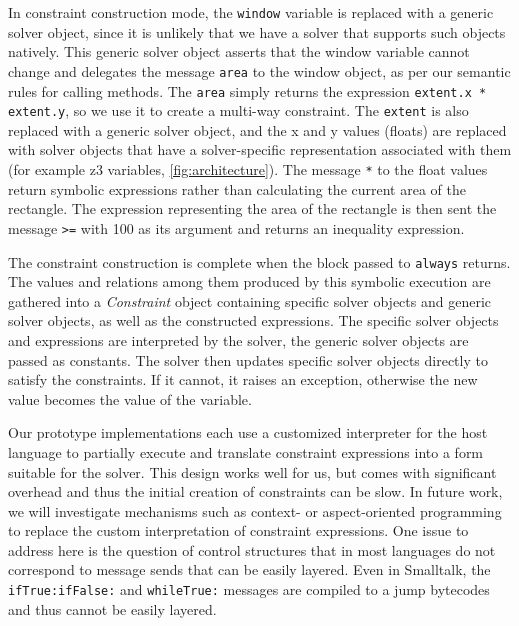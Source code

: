 In constraint construction mode, the \lstinline{window} variable is replaced
with a generic solver object, since it is unlikely that we have a solver that
supports such objects natively. This generic solver object asserts that the
window variable cannot change and delegates the message \lstinline{area} to the
window object, as per our semantic rules for calling methods. The
\lstinline{area} simply returns the expression \lstinline{extent.x * extent.y},
so we use it to create a multi-way constraint. The \lstinline{extent} is also
replaced with a generic solver object, and the x and y values (floats) are
replaced with solver objects that have a solver-specific representation
associated with them (for example \gls{z3} variables, \cf
{\autoref{fig:architecture}}). The message \lstinline{*} to the float values
return symbolic expressions rather than calculating the current area of the
rectangle.  The expression representing the area of the rectangle is then sent
the message \lstinline{>=} with 100 as its argument and returns an inequality
expression.

The constraint construction is complete when the block passed to
\lstinline{always} returns. The values and relations among them produced by this
symbolic execution are gathered into a \emph{Constraint} object containing
specific solver objects and generic solver objects, as well as the constructed
expressions. The specific solver objects and expressions are interpreted by the
solver, the generic solver objects are passed as constants. The solver then
updates specific solver objects directly to satisfy the constraints. If it
cannot, it raises an exception, otherwise the new value becomes the value of the
variable.

\SummarySep

Our prototype implementations each use a customized interpreter for the host
language to partially execute and translate constraint expressions into a form
suitable for the solver. This design works well for us, but comes with
significant overhead and thus the initial creation of constraints can be
slow. In future work, we will investigate mechanisms such as context- or
aspect-oriented programming to replace the custom interpretation of constraint
expressions. One issue to address here is the question of control structures
that in most languages do not correspond to message sends that can be easily
layered. Even in Smalltalk, the \lstinline{ifTrue:ifFalse:} and
\lstinline{whileTrue:} messages are compiled to a jump bytecodes and thus cannot
be easily layered.


